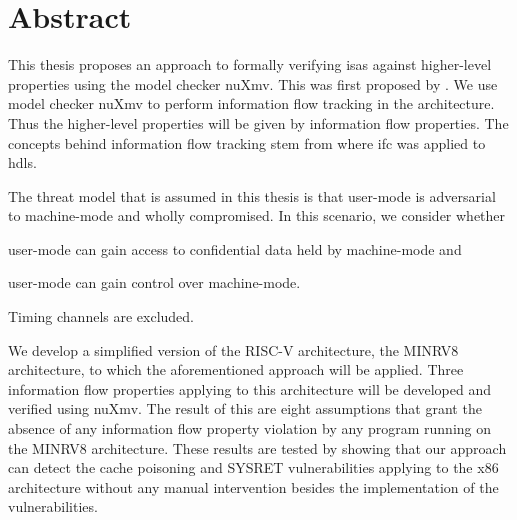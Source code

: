 \chapter*{\centering Abstract}

This thesis proposes an approach to formally verifying \glspl{isa} against higher-level properties using the model checker nuXmv.
This was first proposed by \cite{Reid17}.
We use model checker nuXmv to perform information flow tracking in the architecture.
Thus the higher-level properties will be given by information flow properties.
The concepts behind information flow tracking stem from \cite{Ferraiuolo17} where \gls{ifc} was applied to \glspl{hdl}.

The threat model that is assumed in this thesis is that user-mode is adversarial to machine-mode and wholly compromised.
In this scenario, we consider whether
\begin{enumerate*}[label=\alph*)]
    \item user-mode can gain access to confidential data held by machine-mode and
    \item user-mode can gain control over machine-mode.
\end{enumerate*}
Timing channels are excluded.

We develop a simplified version of the RISC-V architecture, the MINRV8 architecture, to which the aforementioned approach will be applied.
Three information flow properties applying to this architecture will be developed and verified using nuXmv.
The result of this are eight assumptions that grant the absence of any information flow property violation by any program running on the MINRV8 architecture.
These results are tested by showing that our approach can detect the cache poisoning \cite{Wojtczuk09} and SYSRET vulnerabilities \cite{SYSRET-vuln,Dunlap19} applying to the x86 architecture without any manual intervention besides the implementation of the vulnerabilities.
